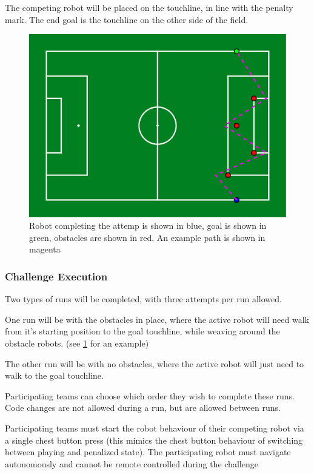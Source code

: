 The competing robot will be placed on the touchline, in line with the penalty mark.
The end goal is the touchline on the other side of the field.

\begin{figure}[t]
    \centerline{\includegraphics[width=\columnwidth]{figs/walk_leaderboard.pdf}}
    \caption{Robot completing the attemp is shown in blue, goal is shown in green, obstacles are shown in red. An example path is shown in magenta}
    \label{fig:walk_leaderboard}
\end{figure}

\subsubsection{Challenge Execution}
Two types of runs will be completed, with three attempts per run allowed.

One run will be with the obstacles in place, where the active robot will need walk from it's
starting position to the goal touchline, while weaving around the obstacle robots. (see \cref{fig:walk_leaderboard} for an example)

The other run will be with no obstacles, where the active robot will just need to walk 
to the goal touchline.

Participating teams can choose which order they wish to complete these runs. Code changes are not allowed during a run,
but are allowed between runs.

Participating teams must start the robot behaviour of their competing robot via a single chest button
press (this mimics the chest button behaviour of switching between playing and penalized state).
The participating robot must navigate autonomously and cannot be remote controlled during the challenge

